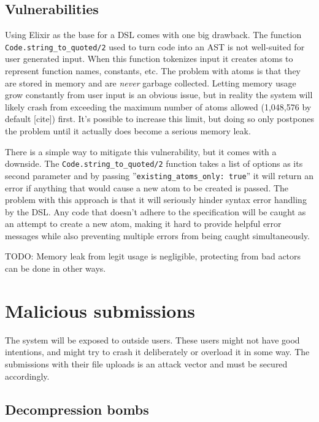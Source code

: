 
\subsection{Vulnerabilities}
Using Elixir as the base for a DSL comes with one big drawback. The function \texttt{Code.string_to_quoted/2} used to turn code into an AST is not well-suited for user generated input. When this function tokenizes input it creates atoms to represent function names, constants, etc. The problem with atoms is that they are stored in memory and are \textit{never} garbage collected. Letting memory usage grow constantly from user input is an obvious issue, but in reality the system will likely crash from exceeding the maximum number of atoms allowed (1,048,576 by default [cite]) first. It's possible to increase this limit, but doing so only postpones the problem until it actually does become a serious memory leak.

There is a simple way to mitigate this vulnerability, but it comes with a downside. The \texttt{Code.string_to_quoted/2} function takes a list of options as its second parameter and by passing ''\texttt{existing_atoms_only: true}'' it will return an error if anything that would cause a new atom to be created is passed. The problem with this approach is that it will seriously hinder syntax error handling by the DSL. Any code that doesn't adhere to the specification will be caught as an attempt to create a new atom, making it hard to provide helpful error messages while also preventing multiple errors from being caught simultaneously.

TODO: Memory leak from legit usage is negligible, protecting from bad actors can be done in other ways.  

\section{Malicious submissions}

The system will be exposed to outside users. These users might not have good intentions, and might try to crash it deliberately or overload it in some way. The submissions with their file uploads is an attack vector and must be secured accordingly.

\subsection{Decompression bombs}
\label{decompression_bombs}

